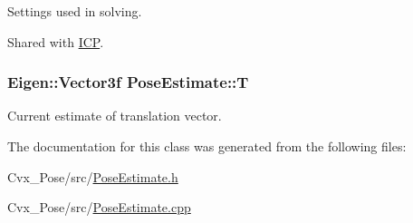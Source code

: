 \-Settings used in solving. 

\-Shared with \hyperlink{classICP}{\-I\-C\-P}. \hypertarget{classPoseEstimate_a31a1a39ab75efc08a00ddc8f8f75b60b}{
\subsubsection[{\-T}]{\setlength{\rightskip}{0pt plus 5cm}\-Eigen\-::\-Vector3f {\bf \-Pose\-Estimate\-::\-T}}}\label{classPoseEstimate_a31a1a39ab75efc08a00ddc8f8f75b60b}


\-Current estimate of translation vector. 



\-The documentation for this class was generated from the following files\-:\begin{DoxyCompactItemize}
\item 
\-Cvx\-\_\-\-Pose/src/\hyperlink{PoseEstimate_8h}{\-Pose\-Estimate.\-h}\item 
\-Cvx\-\_\-\-Pose/src/\hyperlink{PoseEstimate_8cpp}{\-Pose\-Estimate.\-cpp}\end{DoxyCompactItemize}
